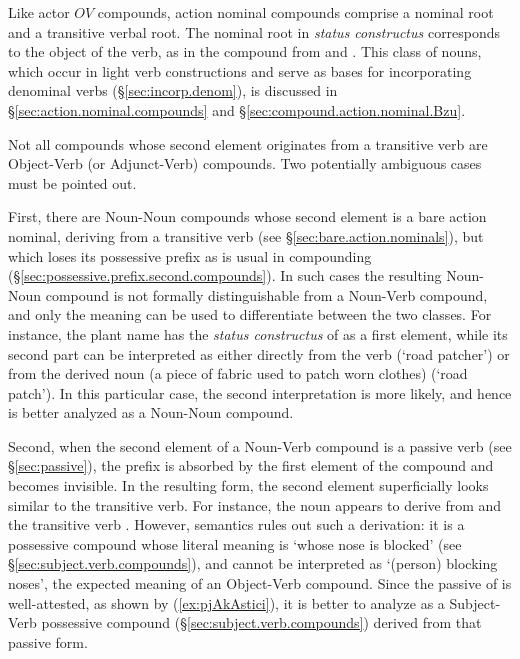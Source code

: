 Like actor $OV$ compounds, action nominal compounds comprise a nominal root and a transitive verbal root. The nominal root in \textit{status constructus} corresponds to the object of the verb, as in the compound  from  and . This class of nouns, which occur in light verb constructions and serve as bases for incorporating denominal verbs (§\ref{sec:incorp.denom}), is discussed in §\ref{sec:action.nominal.compounds} and §\ref{sec:compound.action.nominal.Bzu}. 

Not all compounds whose second element originates from a transitive verb are Object-Verb (or Adjunct-Verb) compounds. Two potentially ambiguous cases must be pointed out. 

First, there are Noun-Noun compounds whose second element is a bare action nominal, deriving from a transitive verb (see §\ref{sec:bare.action.nominals}), but which loses its possessive prefix as is usual in compounding (§\ref{sec:possessive.prefix.second.compounds}). In such cases the resulting Noun-Noun compound is not formally distinguishable from a Noun-Verb compound, and only the meaning can be used to differentiate between the two classes. For instance, the  plant name  has the \textit{status constructus} of  as a first element, while its second part  can be interpreted as either directly from the verb  (`road patcher') or from the derived noun  (a piece of fabric used to patch worn clothes) (`road patch'). In this particular case, the second interpretation is more likely, and hence  is better analyzed as a Noun-Noun compound.
 
Second, when the second element of a Noun-Verb compound is a  passive verb (see §\ref{sec:passive}), the  prefix is absorbed by the first element of the compound and becomes invisible. In the resulting form, the second element superficially looks similar to the transitive verb. For instance, the noun  appears to derive from  and the transitive verb  . However, semantics rules out such a derivation: it is a possessive compound whose literal meaning is `whose nose is blocked' (see §\ref{sec:subject.verb.compounds}), and cannot be interpreted as `(person) blocking noses', the expected meaning of an Object-Verb compound. Since the passive  of   is well-attested, as shown by (\ref{ex:pjAkAstici}), it is better to analyze  as a Subject-Verb possessive compound (§\ref{sec:subject.verb.compounds}) derived from that passive form.
 
